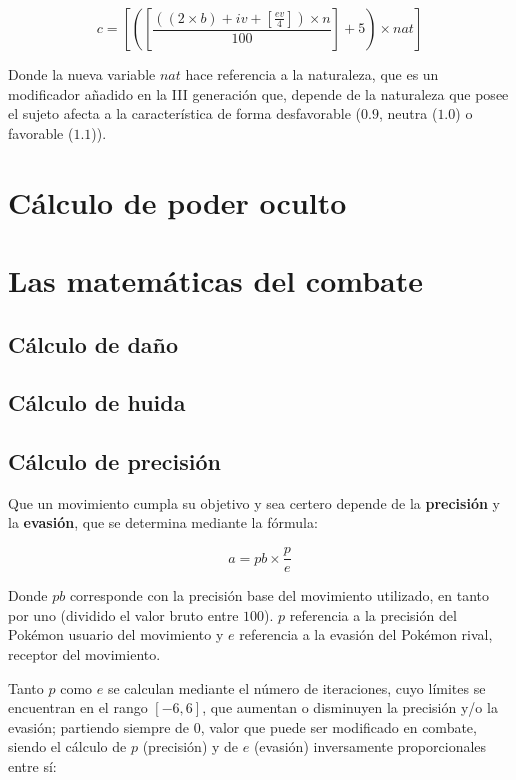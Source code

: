 \documentclass[a4paper, 11pt, titlepage]{article}
\begin{document}
    \[
        c = [([\frac{((2 \times b) + iv + [\frac{ev}{4}]) \times n}{100}] + 5) \times nat]    
    \]

    Donde la nueva variable $nat$ hace referencia a la naturaleza, que es un modificador 
    añadido en la III generación que, depende de la naturaleza que posee el sujeto afecta a 
    la característica de forma desfavorable ($0.9$, neutra ($1.0$) o favorable ($1.1$)).

\section{Cálculo de poder oculto}

\section{Las matemáticas del combate}

    \subsection{Cálculo de daño}

    \subsection{Cálculo de huida}

    \subsection{Cálculo de precisión}\label{precision}

        Que un movimiento cumpla su objetivo y sea certero depende de la \textbf{precisión} y 
        la \textbf{evasión}, que se determina mediante la fórmula:

        \[
            a = pb \times \frac{p}{e}    
        \]

        Donde $pb$ corresponde con la precisión base del movimiento utilizado, en tanto por 
        uno (dividido el valor bruto entre $100$). $p$ referencia a la precisión del Pokémon 
        usuario del movimiento y $e$ referencia a la evasión del Pokémon rival, receptor del 
        movimiento. 
        
        Tanto $p$ como $e$ se calculan mediante el número de iteraciones, cuyo límites se 
        encuentran en el rango $[-6,6]$, que aumentan o disminuyen la precisión y/o la evasión; 
        partiendo siempre de $0$, valor que puede ser modificado en combate, siendo el cálculo  
        de $p$ (precisión) y de $e$ (evasión) inversamente proporcionales entre sí:
\end{document}
